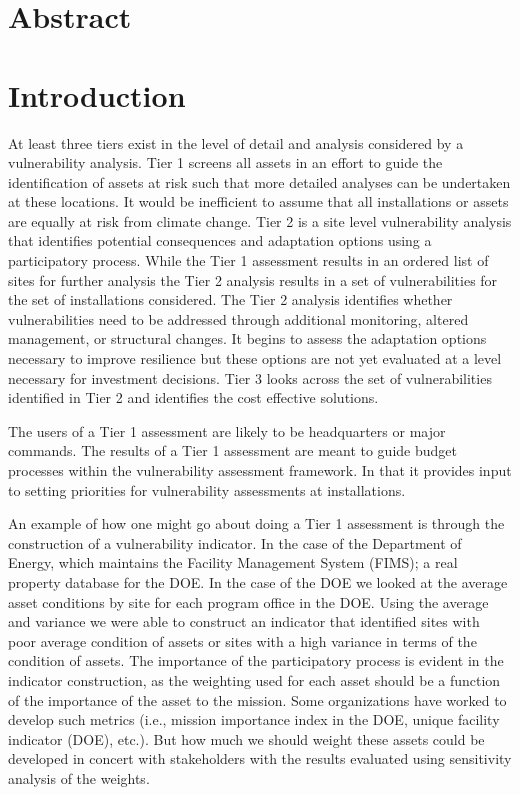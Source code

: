\documentclass[10pt]{amsart}
\begin{document}
\section{Abstract}
\section{Introduction}
At least three tiers exist in the level of detail and analysis considered by a vulnerability analysis.
Tier 1 screens all assets in an effort to guide the identification of assets at risk such that more detailed analyses can be undertaken at these locations.
It would be inefficient to assume that all installations or assets are equally at risk from climate change.
Tier 2 is a site level vulnerability analysis that identifies potential consequences and adaptation options using a participatory process.
While the Tier 1 assessment results in an ordered list of sites for further analysis the Tier 2 analysis results in a set of vulnerabilities for the set of installations considered.
The Tier 2 analysis identifies whether vulnerabilities need to be addressed through additional monitoring, altered management, or structural changes.
It begins to assess the adaptation options necessary to improve resilience but these options are not yet evaluated at a level necessary for investment decisions.
Tier 3 looks across the set of vulnerabilities identified in Tier 2 and identifies the cost effective solutions.

The users of a Tier 1 assessment are likely to be headquarters or major commands.
The results of a Tier 1 assessment are meant to guide budget processes within the vulnerability assessment framework.
In that it provides input to setting priorities for vulnerability assessments at installations.

An example of how one might go about doing a Tier 1 assessment is through the construction of a vulnerability indicator.
In the case of the Department of Energy, which maintains the Facility Management System (FIMS); a real property database for the DOE.
In the case of the DOE we looked at the average asset conditions by site for each program office in the DOE. 
Using the average and variance we were able to construct an indicator that identified sites with poor average condition of assets or sites with a high variance in terms of the condition of assets.
The importance of the participatory process is evident in the indicator construction, as the weighting used for each asset should be a function of the importance of the asset to the mission.
Some organizations have worked to develop such metrics (i.e., mission importance index in the DOE, unique facility indicator (DOE), etc.).
But how much we should weight these assets could be developed in concert with stakeholders with the results evaluated using sensitivity analysis of the weights.
\end{document}
